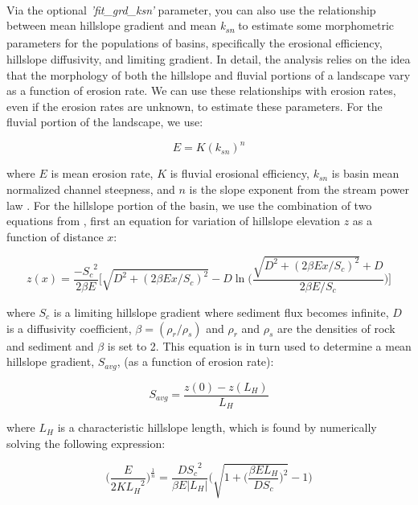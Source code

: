 \paragraph{}Via the optional \textit{'fit\_grd\_ksn'} parameter, you can also use the relationship between mean hillslope gradient and mean \textit{k\textsubscript{sn}} to estimate some morphometric parameters for the populations of basins, specifically the erosional efficiency, hillslope diffusivity, and limiting gradient. In detail, the analysis relies on the idea that the morphology of both the hillslope and fluvial portions of a landscape vary as a function of erosion rate. We can use these relationships with erosion rates, even if the erosion rates are unknown, to estimate these parameters. For the fluvial portion of the landscape, we use:

\begin{equation}
E=K(k_{sn})^{n}
\end{equation}

\noindent
where $E$ is mean erosion rate, $K$ is fluvial erosional efficiency, $k_{sn}$ is basin mean normalized channel steepness, and $n$ is the slope exponent from the stream power law \citep[e.g.,][]{Snyder2003,Ouimet2009}. For the hillslope portion of the basin, we use the combination of two equations from \cite{Roering2007}, first an equation for variation of hillslope elevation $z$ as a function of distance $x$:

\begin{equation}
z(x) = \frac{-{S_{c}}^{2}}{2\beta E}  \bigg[ \sqrt{D^{2} + (2\beta Ex / S_{c})^{2}} -D\ln\bigg( \frac{ \sqrt{D^{2} + (2\beta Ex / S_{c})^{2}} + D}{2\beta E/S_{c}} \bigg)   \bigg]
\end{equation}

\noindent
where $S_{c}$ is a limiting hillslope gradient where sediment flux becomes infinite, $D$ is a diffusivity coefficient, $\beta = (\rho_{r}/\rho_{s})$ and $\rho_{r}$ and $\rho_{s}$ are the densities of rock and sediment and $\beta$ is set to 2. This equation is in turn used to determine a mean hillslope gradient, $S_{avg}$, (as a function of erosion rate):

\begin{equation}
S_{avg}=\frac{z(0)-z(L_{H})}{L_{H}}
\end{equation}

\noindent where $L_{H}$ is a characteristic hillslope length, which is found by numerically solving the following expression:

\begin{equation}
\bigg(  \frac{E}{2K{L_{H}}^{2}}  \bigg)^{\frac{1}{n}} = \frac{D{S_{c}}^{2}}{\beta E |L_{H}|} \Bigg( \sqrt{1 + \bigg( \frac{\beta E L_{H}}{DS_{c}} \bigg)^{2} } - 1 \Bigg)
\end{equation}

